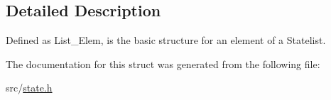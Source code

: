 \subsection{Detailed Description}
Defined as List\+\_\+\+Elem, is the basic structure for an element of a Statelist. 

The documentation for this struct was generated from the following file\+:\begin{DoxyCompactItemize}
\item 
src/\hyperlink{state_8h}{state.\+h}\end{DoxyCompactItemize}
